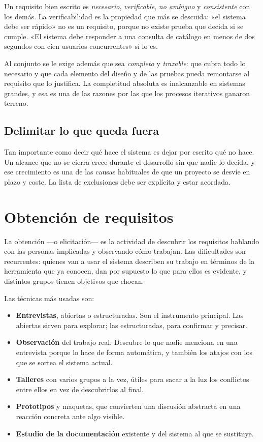 Un requisito bien escrito es \emph{necesario}, \emph{verificable}, \emph{no
ambiguo} y \emph{consistente} con los demás. La verificabilidad es la propiedad
que más se descuida: «el sistema debe ser rápido» no es un requisito, porque no
existe prueba que decida si se cumple. «El sistema debe responder a una consulta
de catálogo en menos de dos segundos con cien usuarios concurrentes» sí lo es.

Al conjunto se le exige además que sea \emph{completo} y \emph{trazable}: que
cubra todo lo necesario y que cada elemento del diseño y de las pruebas pueda
remontarse al requisito que lo justifica. La completitud absoluta es inalcanzable
en sistemas grandes, y esa es una de las razones por las que los procesos
iterativos ganaron terreno.

\subsection*{Delimitar lo que queda fuera}

Tan importante como decir qué hace el sistema es dejar por escrito qué no hace. Un
alcance que no se cierra crece durante el desarrollo sin que nadie lo decida, y
ese crecimiento es una de las causas habituales de que un proyecto se desvíe en
plazo y coste. La lista de exclusiones debe ser explícita y estar acordada.

\section{Obtención de requisitos}

La obtención —o elicitación— es la actividad de descubrir los requisitos hablando
con las personas implicadas y observando cómo trabajan. Las dificultades son
recurrentes: quienes van a usar el sistema describen su trabajo en términos de la
herramienta que ya conocen, dan por supuesto lo que para ellos es evidente, y
distintos grupos tienen objetivos que chocan.

Las técnicas más usadas son:

\begin{itemize}
    \item \textbf{Entrevistas}, abiertas o estructuradas. Son el instrumento
          principal. Las abiertas sirven para explorar; las estructuradas, para
          confirmar y precisar.
    \item \textbf{Observación} del trabajo real. Descubre lo que nadie menciona en
          una entrevista porque lo hace de forma automática, y también los atajos
          con los que se sortea el sistema actual.
    \item \textbf{Talleres} con varios grupos a la vez, útiles para sacar a la luz
          los conflictos entre ellos en vez de descubrirlos al final.
    \item \textbf{Prototipos} y maquetas, que convierten una discusión abstracta
          en una reacción concreta ante algo visible.
    \item \textbf{Estudio de la documentación} existente y del sistema al que se
          sustituye.
\end{itemize}

